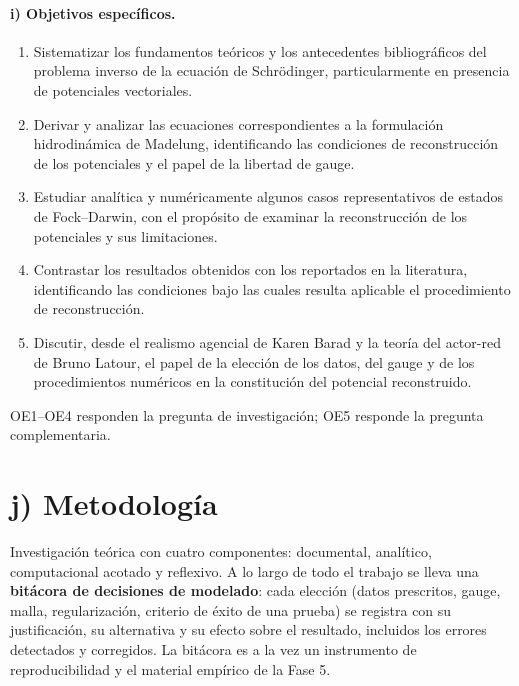 \documentclass[12pt,letterpaper]{article}
\begin{document}
\paragraph{i) Objetivos específicos.}
\begin{enumerate}[label=OE\arabic*.,leftmargin=3em]
  \item Sistematizar los fundamentos teóricos y los antecedentes bibliográficos del problema inverso de la ecuación de
        Schrödinger, particularmente en presencia de potenciales vectoriales.
  \item Derivar y analizar las ecuaciones correspondientes a la formulación hidrodinámica de Madelung, identificando las
        condiciones de reconstrucción de los potenciales y el papel de la libertad de gauge.
  \item Estudiar analítica y numéricamente algunos casos representativos de estados de Fock--Darwin, con el propósito de
        examinar la reconstrucción de los potenciales y sus limitaciones.
  \item Contrastar los resultados obtenidos con los reportados en la literatura, identificando las condiciones bajo las
        cuales resulta aplicable el procedimiento de reconstrucción.
  \item Discutir, desde el realismo agencial de Karen Barad y la teoría del actor-red de Bruno Latour, el papel de la
        elección de los datos, del gauge y de los procedimientos numéricos en la constitución del potencial reconstruido.
\end{enumerate}
OE1--OE4 responden la pregunta de investigación; OE5 responde la pregunta complementaria.

\section*{j) Metodología}
Investigación teórica con cuatro componentes: documental, analítico, computacional acotado y reflexivo. A lo largo de
todo el trabajo se lleva una \textbf{bitácora de decisiones de modelado}: cada elección (datos prescritos, gauge, malla,
regularización, criterio de éxito de una prueba) se registra con su justificación, su alternativa y su efecto sobre el
resultado, incluidos los errores detectados y corregidos. La bitácora es a la vez un instrumento de reproducibilidad y el
material empírico de la Fase 5.
\end{document}
